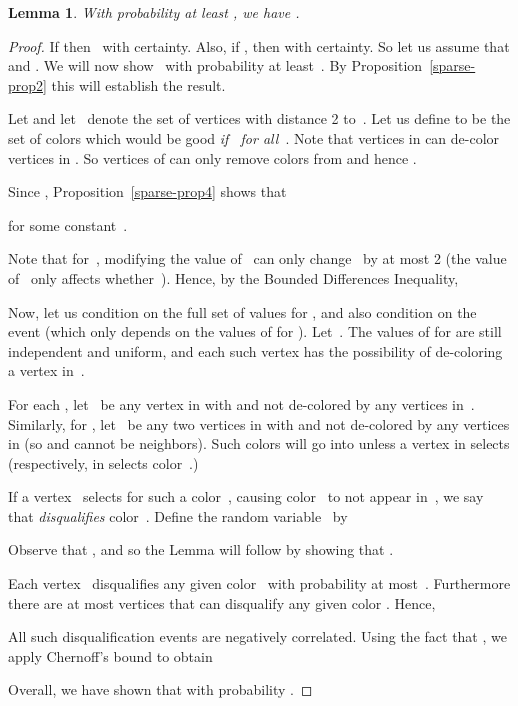 \documentclass[11pt]{amsart}
\newtheorem{lemma}[theorem]{Lemma}
\begin{document}
\begin{lemma}
\label{sparse-conc-prop}
With probability at least , we have .
\end{lemma}
\begin{proof}
If  then~ with certainty. Also, if , then  with certainty. So let us assume that  and . We will now show~ with probability at least~. By Proposition~\ref{sparse-prop2} this will establish the result.

Let  and let~ denote the set of vertices with distance 2 to~. Let us define  to be the set of colors which would be good \emph{if~ for all~}. Note that vertices in  can de-color vertices in . So vertices of  can only remove colors from  and hence  .

Since , Proposition~\ref{sparse-prop4} shows that 

for some constant~. 

Note that for~, modifying the value of~ can only change~ by at most 2 (the value of~ only affects whether~). Hence, by the Bounded Differences Inequality,


Now, let us condition on the full set of values  for , and also condition on the event  (which only depends on the values of  for ). Let~. The values of  for  are still independent and uniform, and each such vertex has the possibility of de-coloring a vertex in~.

For each , let~ be any vertex in  with  and not de-colored by any vertices in~. Similarly, for , let~ be any two vertices in  with  and not de-colored by any vertices in  (so  and  cannot be neighbors). Such colors will go into  unless a vertex in  selects  (respectively, in  selects color~.)

If a vertex~ selects  for such a color~, causing color~ to not appear in~, we say that  \emph{disqualifies} color~. Define the random variable~ by


Observe that , and so the Lemma will follow by showing that .

Each vertex~ disqualifies any given color~ with probability at most~. Furthermore there are at most  vertices  that can disqualify any given color . Hence,


All such disqualification events are negatively correlated. Using the fact that , we apply Chernoff's bound to obtain


Overall, we have shown that  with probability .
\end{proof}
\end{document}
